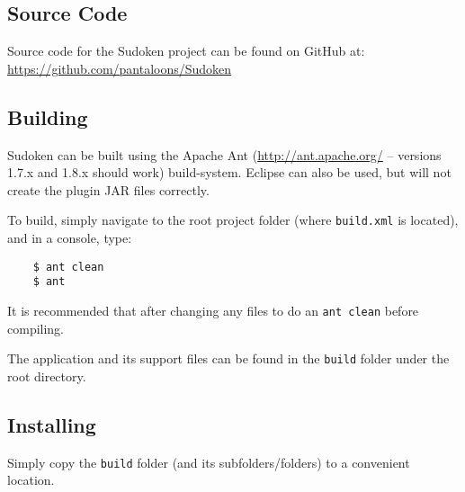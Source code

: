 \subsection{Source Code}
Source code for the Sudoken project can be found on GitHub at:
\\
\url{https://github.com/pantaloons/Sudoken}

\subsection{Building}
Sudoken can be built using the Apache Ant (\url{http://ant.apache.org/} -- versions 1.7.x and 1.8.x should work) build-system. Eclipse can also be used, but will not create the plugin JAR files correctly. 

To build, simply navigate to the root project folder (where \texttt{build.xml} is located), and in a console, type:
\begin{verbatim}
	$ ant clean
	$ ant
\end{verbatim}

It is recommended that after changing any files to do an \texttt{ant clean} before compiling.

The application and its support files can be found in the \texttt{build} folder under the root directory.

\subsection{Installing}
Simply copy the \texttt{build} folder (and its subfolders/folders) to a convenient location.